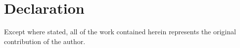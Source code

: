 
\chapter*{Declaration}

\begin{list}{}{%
  \setlength{\leftmargin}{2cm}%
  \setlength{\rightmargin}{2cm}%
}\item[]

Except where stated, all of the work contained herein represents the original contribution of the author.



\end{list}

